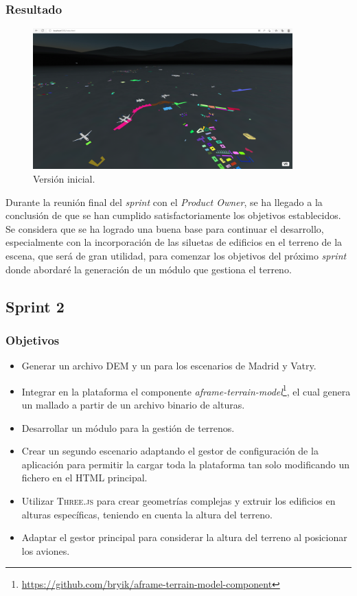 \documentclass[a4paper, 11pt]{book}
\begin{document}
\subsubsection{Resultado}
\begin{figure}[h]
  \centering
  \includegraphics[width=10cm, keepaspectratio]{img/Sprint1.png}
  \caption{Versión inicial.}
  \label{fig:sprint1}
\end{figure}
Durante la reunión final del \emph{sprint} con el \emph{Product Owner}, se ha llegado a la conclusión de que se han cumplido satisfactoriamente los objetivos establecidos. Se considera que se ha logrado una buena base para continuar el desarrollo, especialmente con la incorporación de las siluetas de edificios en el terreno de la escena, que será de gran utilidad, para comenzar los objetivos del próximo \emph{sprint} donde abordaré la generación de un módulo que gestiona el terreno.
\subsection{Sprint 2}
\subsubsection{Objetivos}
\begin{itemize}
    \item Generar un archivo \textsc{DEM} y un \emph{} para los escenarios de Madrid y Vatry.
    \item Integrar en la plataforma el componente \emph{aframe-terrain-model}\footnote{\url{https://github.com/bryik/aframe-terrain-model-component}}, el cual genera un mallado a partir de un archivo binario de alturas.
    \item Desarrollar un módulo para la gestión de terrenos.
    \item Crear un segundo escenario adaptando el gestor de configuración de la aplicación para permitir la cargar toda la plataforma tan solo modificando un fichero en el \textsc{HTML} principal.
    \item Utilizar \textsc{Three.js} para crear geometrías complejas y extruir los edificios en alturas específicas, teniendo en cuenta la altura del terreno.
    \item Adaptar el gestor principal para considerar la altura del terreno al posicionar los aviones.
\end{itemize}
\end{document}
